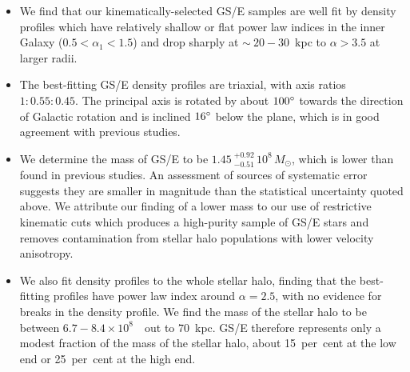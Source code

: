 \begin{itemize}
    \item We find that our kinematically-selected GS/E samples are well fit by density profiles which have relatively shallow or flat power law indices in the inner Galaxy ($0.5 < \alpha_{1} < 1.5$) and drop sharply at $\sim~20-30$~kpc to $\alpha>3.5$ at larger radii.
    
    \item The best-fitting GS/E density profiles are triaxial, with axis ratios $1:0.55:0.45$. The principal axis is rotated by about $100\hbox{$^\circ$}$ towards the direction of Galactic rotation and is inclined $16\hbox{$^\circ$}$ below the plane, which is in good agreement with previous studies.

    \item We determine the mass of GS/E to be $1.45\ ^{+0.92}_{-0.51}\,10^8\,M_\odot$, which is lower than found in previous studies. An assessment of sources of systematic error suggests they are smaller in magnitude than the statistical uncertainty quoted above. We attribute our finding of a lower mass to our use of restrictive kinematic cuts which produces a high-purity sample of GS/E stars and removes contamination from stellar halo populations with lower velocity anisotropy.


    \item We also fit density profiles to the whole stellar halo, finding that the best-fitting profiles have power law index around $\alpha=2.5$, with no evidence for breaks in the density profile. We find the mass of the stellar halo to be between $6.7-8.4\times10^{8}$~\Msun\ out to 70~kpc. GS/E therefore represents only a modest fraction of the mass of the stellar halo, about 15~per~cent at the low end or 25~per~cent at the high end.
\end{itemize}

